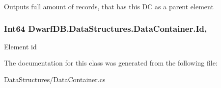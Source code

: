 Outputs full amount of records, that has this D\+C as a parent element 

\hypertarget{class_dwarf_d_b_1_1_data_structures_1_1_data_container_a3749f4fe324b56d46caf071488c615d7}{
\subsubsection[{Id}]{\setlength{\rightskip}{0pt plus 5cm}Int64 Dwarf\+D\+B.\+Data\+Structures.\+Data\+Container.\+Id\hspace{0.3cm}{\ttfamily [get]}, {\ttfamily [set]}}}\label{class_dwarf_d_b_1_1_data_structures_1_1_data_container_a3749f4fe324b56d46caf071488c615d7}


Element id 



The documentation for this class was generated from the following file\+:\begin{DoxyCompactItemize}
\item 
Data\+Structures/Data\+Container.\+cs\end{DoxyCompactItemize}
